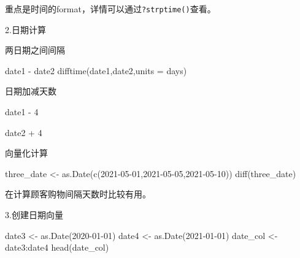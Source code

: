 \documentclass[
]{book}
\newenvironment{Shaded}{\begin{snugshade}}{\end{snugshade}}
\newcommand{\AttributeTok}[1]{\textcolor[rgb]{0.77,0.63,0.00}{#1}}
\newcommand{\DecValTok}[1]{\textcolor[rgb]{0.00,0.00,0.81}{#1}}
\newcommand{\FunctionTok}[1]{\textcolor[rgb]{0.00,0.00,0.00}{#1}}
\newcommand{\NormalTok}[1]{#1}
\newcommand{\OtherTok}[1]{\textcolor[rgb]{0.56,0.35,0.01}{#1}}
\newcommand{\SpecialCharTok}[1]{\textcolor[rgb]{0.00,0.00,0.00}{#1}}
\newcommand{\StringTok}[1]{\textcolor[rgb]{0.31,0.60,0.02}{#1}}
\begin{document}
重点是时间的format，详情可以通过\texttt{?strptime()}查看。

2.日期计算

两日期之间间隔

\begin{Shaded}
\begin{Highlighting}[]
\NormalTok{date1 }\SpecialCharTok{{-}}\NormalTok{ date2}
\FunctionTok{difftime}\NormalTok{(date1,date2,}\AttributeTok{units =} \StringTok{\textquotesingle{}days\textquotesingle{}}\NormalTok{)}
\end{Highlighting}
\end{Shaded}

日期加减天数

\begin{Shaded}
\begin{Highlighting}[]
\NormalTok{date1 }\SpecialCharTok{{-}} \DecValTok{4}

\NormalTok{date2 }\SpecialCharTok{+} \DecValTok{4}
\end{Highlighting}
\end{Shaded}

向量化计算

\begin{Shaded}
\begin{Highlighting}[]
\NormalTok{three\_date }\OtherTok{\textless{}{-}} \FunctionTok{as.Date}\NormalTok{(}\FunctionTok{c}\NormalTok{(}\StringTok{\textquotesingle{}2021{-}05{-}01\textquotesingle{}}\NormalTok{,}\StringTok{\textquotesingle{}2021{-}05{-}05\textquotesingle{}}\NormalTok{,}\StringTok{\textquotesingle{}2021{-}05{-}10\textquotesingle{}}\NormalTok{))}
\FunctionTok{diff}\NormalTok{(three\_date)}
\end{Highlighting}
\end{Shaded}

在计算顾客购物间隔天数时比较有用。

3.创建日期向量

\begin{Shaded}
\begin{Highlighting}[]
\NormalTok{date3 }\OtherTok{\textless{}{-}} \FunctionTok{as.Date}\NormalTok{(}\StringTok{\textquotesingle{}2020{-}01{-}01\textquotesingle{}}\NormalTok{)}
\NormalTok{date4 }\OtherTok{\textless{}{-}} \FunctionTok{as.Date}\NormalTok{(}\StringTok{\textquotesingle{}2021{-}01{-}01\textquotesingle{}}\NormalTok{)}
\NormalTok{date\_col }\OtherTok{\textless{}{-}}\NormalTok{ date3}\SpecialCharTok{:}\NormalTok{date4}
\FunctionTok{head}\NormalTok{(date\_col)}
\end{Highlighting}
\end{Shaded}
\end{document}
